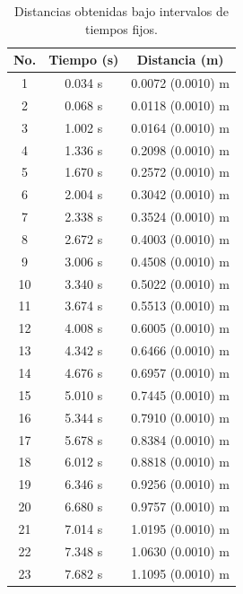 \documentclass[12pt,a4paper]{article}
\begin{document}
\begin{table}[h!]
\begin{center}
\begin{tabular}{|c|c|c|}
\hline
No. & Tiempo (s) & Distancia (m) \\ \hline 

1 & 0.034 s & 0.0072 (0.0010) m \\ \hline 
2 & 0.068 s & 0.0118 (0.0010) m \\ \hline 
3 & 1.002 s & 0.0164 (0.0010) m \\ \hline 
4 & 1.336 s & 0.2098 (0.0010) m \\ \hline 
5 & 1.670 s & 0.2572 (0.0010) m \\ \hline 
6 & 2.004 s & 0.3042 (0.0010) m \\ \hline 
7 & 2.338 s & 0.3524 (0.0010) m \\ \hline 
8 & 2.672 s & 0.4003 (0.0010) m \\ \hline 
9 & 3.006 s & 0.4508 (0.0010) m \\ \hline 
10 & 3.340 s & 0.5022 (0.0010) m \\ \hline 
11 & 3.674 s & 0.5513 (0.0010) m \\ \hline 
12 & 4.008 s & 0.6005 (0.0010) m \\ \hline 
13 & 4.342 s & 0.6466 (0.0010) m \\ \hline 
14 & 4.676 s & 0.6957 (0.0010)  m \\ \hline 
15 & 5.010 s & 0.7445 (0.0010) m \\ \hline 
16 & 5.344 s & 0.7910 (0.0010) m \\ \hline 
17 & 5.678 s & 0.8384 (0.0010) m \\ \hline 
18 & 6.012 s & 0.8818 (0.0010) m \\ \hline 
19 & 6.346 s & 0.9256 (0.0010) m \\ \hline 
20 & 6.680 s & 0.9757 (0.0010) m \\ \hline 
21 & 7.014 s & 1.0195 (0.0010) m \\ \hline 
22 & 7.348 s & 1.0630 (0.0010) m \\ \hline 
23 & 7.682 s & 1.1095 (0.0010) m \\ \hline 

\end{tabular}
\caption{Distancias obtenidas bajo intervalos de tiempos fijos.}
\end{center}
\end{table}
\end{document}
